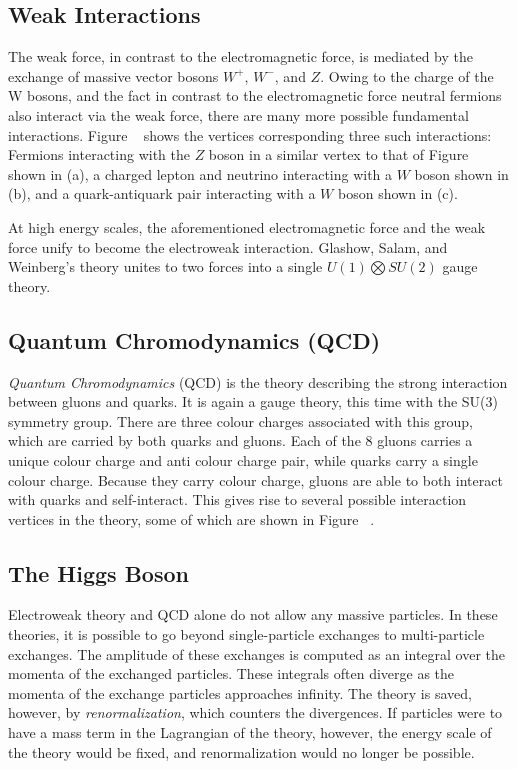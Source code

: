 \subsection{Weak Interactions}
The weak force, in contrast to the electromagnetic force, is mediated by the exchange of massive vector bosons $W^+$, $W^-$, and $Z$. Owing to the charge of the W bosons, and the fact in contrast to the electromagnetic force neutral fermions also interact via the weak force, there are many more possible fundamental interactions. Figure ~ shows the vertices corresponding three such interactions: Fermions interacting with the $Z$ boson in a similar vertex to that of Figure ~ shown in (a), a charged lepton and neutrino interacting with a $W$ boson shown in (b), and a quark-antiquark pair interacting with a $W$ boson shown in (c).

At high energy scales, the aforementioned electromagnetic force and the weak force unify to become the electroweak interaction. Glashow, Salam, and Weinberg's theory unites to two forces into a single $U(1) \bigotimes SU(2)$ gauge theory. 

\subsection{Quantum Chromodynamics (QCD)}
\textit{Quantum Chromodynamics} (QCD) is the theory describing the strong interaction between gluons and quarks. It is again a gauge theory, this time with the SU(3) symmetry group. There are three colour charges associated with this group, which are carried by both quarks and gluons. Each of the 8 gluons carries a unique colour charge and anti colour charge pair, while quarks carry a single colour charge. Because they carry colour charge, gluons are able to both interact with quarks and self-interact. This gives rise to several possible interaction vertices in the theory, some of which are shown in Figure ~.

\subsection{The Higgs Boson}
Electroweak theory and QCD alone do not allow any massive particles. In these theories, it is possible to go beyond single-particle exchanges to multi-particle exchanges. The amplitude of these exchanges is computed as an integral over the momenta of the exchanged particles. These integrals often diverge as the momenta of the exchange particles approaches infinity. The theory is saved, however, by \textit{renormalization}, which counters the divergences. If particles were to have a mass term in the Lagrangian of the theory, however, the energy scale of the theory would be fixed, and renormalization would no longer be possible.

